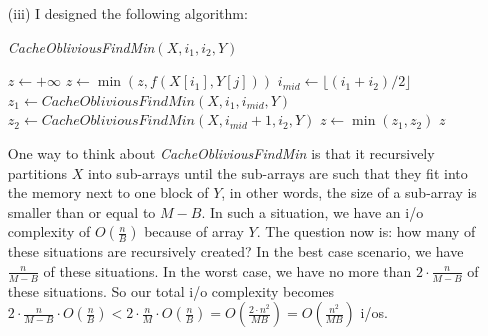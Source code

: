 \documentclass{article}
\newcommand{\io}{{\sc i/o}\xspace}
\newcommand{\ios}{{\io}s\xspace}
\newcounter{rcounter}
\newenvironment{rlist}%
{\begin{list}{\setnr-\arabic{rcounter}}{\usecounter{rcounter}}}{\end{list}}
\begin{document}
\begin{rlist}
\begin{enumerate}
            Again, the algorithm contains two for loops. All data of $X$ is linear read in the outer loop exactly one time, so we have again an \io complexity of $O(\frac{n}{B})$ \ios for $X$. The inner loop has again the same problem as before: since $n \gg M$, $Y$ has to be read once time for every cycle of the outer loop. This gives an \io complexity of $\frac{n}{t} \cdot O(\frac{n}{B}) = \frac{n}{B \cdot \lfloor M / B \rfloor - B} \cdot O(\frac{n}{B}) < \frac{n}{M} \cdot O(\frac{n}{B}) = O(\frac{n^2}{MB})$ \ios.
            \item[(iii)]
            I designed the following algorithm:
            
            \emph{CacheObliviousFindMin}$(X, i_1, i_2, Y)$
            \begin{algorithmic}[1]
                \State $z \gets +\infty$
                \State $z \gets \min (z, f(X[i_1],Y[j]) )$
                \EndFor
                \Else
                \State $i_{mid} \gets \lfloor (i_1 + i_2) / 2 \rfloor$
                \State $z_1 \gets CacheObliviousFindMin(X, i_1, i_{mid}, Y)$
                \State $z_2 \gets CacheObliviousFindMin(X, i_{mid} + 1, i_2, Y)$
                \State $z \gets \min (z_1, z_2)$
                \EndIf
                \State \Return $z$
            \end{algorithmic}
            
            One way to think about \emph{CacheObliviousFindMin} is that it recursively partitions $X$ into sub-arrays until the sub-arrays are such that they fit into the memory next to one block of $Y$, in other words, the size of a sub-array is smaller than or equal to $M-B$. In such a situation, we have an \io complexity of $O(\frac{n}{B})$ because of array $Y$. The question now is: how many of these situations are recursively created? In the best case scenario, we have $\frac{n}{M-B}$ of these situations. In the worst case, we have no more than $2 \cdot \frac{n}{M-B}$ of these situations. So our total \io complexity becomes $2 \cdot \frac{n}{M-B} \cdot O(\frac{n}{B}) < 2 \cdot \frac{n}{M} \cdot O(\frac{n}{B}) = O(\frac{2 \cdot n^2}{MB}) = O(\frac{n^2}{MB})$ \ios.
        \end{enumerate}
        
    \end{rlist}
    
    \renewcommand{\setnr}{IO.II}
\end{document}
